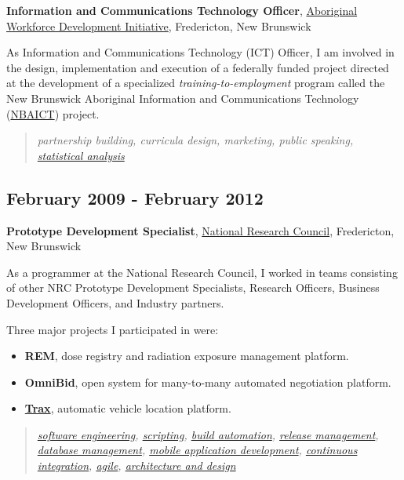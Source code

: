 \documentclass[11pt]{article}
\begin{document}
\textbf{Information and Communications Technology Officer}, \href{http://awdi-nb.com}{Aboriginal Workforce Development Initiative}, Fredericton, New Brunswick

As Information and Communications Technology (ICT) Officer, I am involved in the
design, implementation and execution of a federally funded project directed at the
development of a specialized \emph{training-to-employment} program called the
New Brunswick Aboriginal Information and Communications Technology (\href{http://awdi-nb.org/ict.html}{NBAICT}) project.

\begin{quote}
\emph{partnership building, curricula design, marketing, public speaking, \hyperref[statistical-analysis]{statistical analysis}}
\end{quote}
\subsection{February 2009 - February 2012}
\label{sec-2-3}

\textbf{Prototype Development Specialist}, \href{http://www.nrc-cnrc.gc.ca}{National Research Council}, Fredericton, New Brunswick

As a programmer at the National Research Council, I worked in teams consisting of
other NRC Prototype Development Specialists, Research Officers, Business Development Officers,
and Industry partners.

Three major projects I participated in were:

\begin{itemize}
\item \textbf{REM}, dose registry and radiation exposure management platform.
\item \textbf{OmniBid}, open system for many-to-many automated negotiation platform.
\item \textbf{\href{http://www.redballinternet.ca/advanced-gps-tracking-onboard-connectivity/all-about-trax}{Trax}}, automatic vehicle location platform.
\end{itemize}

\begin{quote}
\emph{\hyperref[sec-5-2]{software engineering}, \hyperref[scripting]{scripting}, \hyperref[automation]{build automation}, \hyperref[automation]{release management}, \hyperref[database-management]{database management}, \hyperref[mobile-application-development]{mobile application development}, \hyperref[automation]{continuous integration}, \hyperref[sec-5-2]{agile}, \hyperref[sec-5-4]{architecture and design}}
\end{quote}
\end{document}
